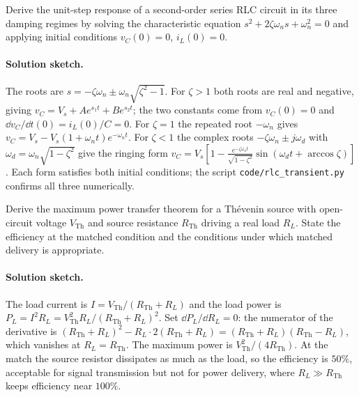 \begin{exercise}
Derive the unit-step response of a second-order series RLC circuit in
its three damping regimes by solving the characteristic equation
$s^{2}+2\zeta\omega_{n}s+\omega_{n}^{2}=0$ and applying initial
conditions $v_{C}(0) = 0$, $i_{L}(0) = 0$.
\paragraph{Solution sketch.}
The roots are $s = -\zeta\omega_{n}\pm\omega_{n}\sqrt{\zeta^{2}-1}$.
For $\zeta>1$ both roots are real and negative, giving $v_{C} = V_{s} +
A e^{s_{1}t} + B e^{s_{2}t}$; the two constants come from $v_{C}(0)=0$
and $\dd v_{C}/\dd t(0) = i_{L}(0)/C = 0$. For $\zeta=1$ the repeated
root $-\omega_{n}$ gives $v_{C} = V_{s} - V_{s}(1+\omega_{n}t)
e^{-\omega_{n}t}$. For $\zeta<1$ the complex roots
$-\zeta\omega_{n}\pm j\omega_{d}$ with $\omega_{d} =
\omega_{n}\sqrt{1-\zeta^{2}}$ give the ringing form
$v_{C} = V_{s}\!\left[1 - \frac{e^{-\zeta\omega_{n}t}}{\sqrt{1-\zeta^{2}}}
\sin(\omega_{d}t + \arccos\zeta)\right]$. Each form satisfies both
initial conditions; the script \texttt{code/rlc\_transient.py} confirms
all three numerically.
\end{exercise}

\begin{exercise}
Derive the maximum power transfer theorem for a Th\'evenin source
with open-circuit voltage $V_{\text{Th}}$ and source resistance
$R_{\text{Th}}$ driving a real load $R_{L}$. State the efficiency at
the matched condition and the conditions under which matched delivery
is appropriate.
\paragraph{Solution sketch.}
The load current is $I = V_{\text{Th}}/(R_{\text{Th}}+R_{L})$ and the
load power is $P_{L} = I^{2}R_{L} = V_{\text{Th}}^{2}R_{L}/(R_{\text{Th}}
+R_{L})^{2}$. Set $\dd P_{L}/\dd R_{L} = 0$: the numerator of the
derivative is $(R_{\text{Th}}+R_{L})^{2} - R_{L}\cdot 2(R_{\text{Th}}+
R_{L}) = (R_{\text{Th}}+R_{L})(R_{\text{Th}}-R_{L})$, which vanishes at
$R_{L} = R_{\text{Th}}$. The maximum power is $V_{\text{Th}}^{2}/
(4R_{\text{Th}})$. At the match the source resistor dissipates as much
as the load, so the efficiency is $50\%$, acceptable for signal
transmission but not for power delivery, where $R_{L}\gg R_{\text{Th}}$
keeps efficiency near $100\%$.
\end{exercise}

